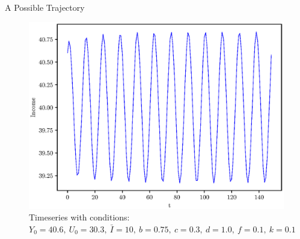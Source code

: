 \documentclass{beamer}
\begin{document}
\begin{frame}{A Possible Trajectory}
	\begin{figure}
		\centering
		\includegraphics[height=0.7\textheight]{timeseries_income.eps}
		\caption{Timeseries with conditions: $Y_0=40.6,\ U_0=30.3,\ \bar I=10,\ b=0.75,\ c=0.3,\ d=1.0,\ f=0.1,\ k=0.1$}
	\end{figure}
\end{frame}
\end{document}
